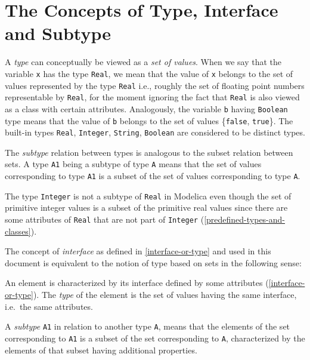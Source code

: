 \section{The Concepts of Type, Interface and Subtype}

A \emph{type} can conceptually be viewed as a \emph{set of values}. When
we say that the variable \lstinline!x! has the type \lstinline!Real!, we mean that the value of
\lstinline!x! belongs to the set of values represented by the type \lstinline!Real! i.e.,
roughly the set of floating point numbers representable by \lstinline!Real!, for the
moment ignoring the fact that \lstinline!Real! is also viewed as a class with
certain attributes. Analogously, the variable \lstinline!b! having \lstinline!Boolean! type
means that the value of \lstinline!b! belongs to the set of values \{\lstinline!false!, \lstinline!true!\}.
The built-in types \lstinline!Real!, \lstinline!Integer!, \lstinline!String!,
\lstinline!Boolean! are considered to be
distinct types.

The \emph{subtype} relation between types is analogous to the subset
relation between sets. A type \lstinline!A1! being a subtype of type \lstinline!A! means that
the set of values corresponding to type \lstinline!A1! is a subset of the set of
values corresponding to type \lstinline!A!.

The type \lstinline!Integer! is not a subtype of \lstinline!Real! in Modelica even though the
set of primitive integer values is a subset of the primitive real values
since there are some attributes of \lstinline!Real! that are not part of \lstinline!Integer!
(\autoref{predefined-types-and-classes}).

The concept of \emph{interface} as defined in \autoref{interface-or-type} and used in
this document is equivalent to the notion of type based on sets in the
following sense:

An element is characterized by its interface defined by some attributes
(\autoref{interface-or-type}). The \emph{type} of the element is the set of values
having the same interface, i.e.\ the same attributes.

A \emph{subtype} \lstinline!A1! in relation to another type \lstinline!A!, means that the
elements of the set corresponding to \lstinline!A1! is a subset of the set
corresponding to \lstinline!A!, characterized by the elements of that subset having
additional properties.


